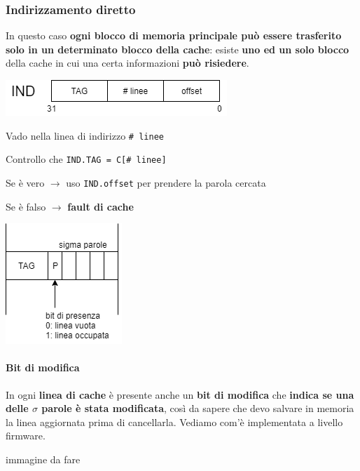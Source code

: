 \documentclass[10pt]{report}
\begin{document}
\subsubsection{Indirizzamento diretto}
In questo caso \textbf{ogni blocco di memoria principale può essere trasferito solo in un determinato blocco della cache}: esiste \textbf{uno ed un solo blocco} della cache in cui una certa informazioni \textbf{può risiedere}.
\begin{multicols}{2}
\begin{center}
	\includegraphics[scale=0.7]{ind.png}
\end{center}
\begin{list}{}{\textbf{Procedura logica per leggere nella cache la parola di IND}}
	\item Vado nella linea di indirizzo \texttt{\# linee}
	\item Controllo che \texttt{IND.TAG = C[\# linee]}
	\item Se è vero $\rightarrow$ uso \texttt{IND.offset} per prendere la parola cercata
	\item Se è falso $\rightarrow$ \textbf{fault di cache}
\end{list}
\columnbreak
\begin{center}
	\includegraphics[scale=1]{indirzz_dir.png}
\end{center}
\end{multicols}
\paragraph{Bit di modifica} In ogni \textbf{linea di cache} è presente anche un \textbf{bit di modifica} che \textbf{indica se una delle $\sigma$ parole è stata modificata}, così da sapere che devo salvare in memoria la linea aggiornata prima di cancellarla. Vediamo com'è implementata a livello firmware.
\begin{center}
immagine da fare
\end{center}
\end{document}
